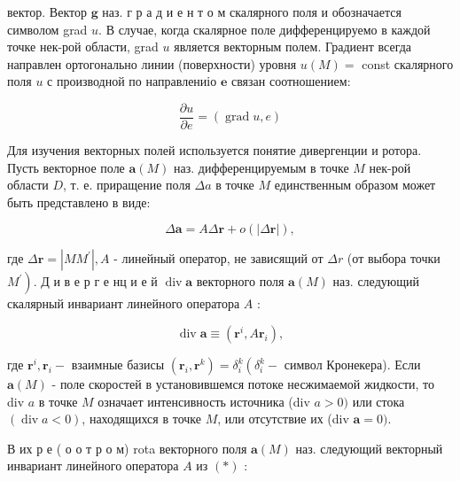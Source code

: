 \documentclass[10pt]{article}
\begin{document}
вектор. Вектор $\boldsymbol{g}$ наз. г р а д и е н т о м скалярного поля и обозначается символом grad $u$. В случае, когда скалярное поле дифференцируемо в каждой точке нек-рой области, grad $u$ является векторным полем. Градиент всегда направлен ортогонально линии (поверхности) уровня $u(M)=$ const скалярного поля $u$ с производной по направлениіо $\boldsymbol{e}$ связан соотношением:



\[

\frac{\partial u}{\partial e}=(\operatorname{grad} u, e)

\]



Для изучения векторных полей используется понятие дивергенции и ротора. Пусть векторное поле $\boldsymbol{a}(M)$ наз. дифференцируемым в точке $M$ нек-рой области $D$, т. е. приращение поля $\Delta a$ в точке $M$ единственным образом может быть представлено в виде:



\[

\Delta \boldsymbol{a}=A \Delta \boldsymbol{r}+o(|\Delta \boldsymbol{r}|),

\]



где $\Delta \boldsymbol{r}=\left|M M^{\prime}\right|, A$ - линейный оператор, не зависящий от $\Delta r$ (от выбора точки $\left.M^{\prime}\right)$. Д и в е р г е нц и е й $\operatorname{div} \boldsymbol{a}$ векторного поля $\boldsymbol{a}(M)$ наз. следующий скалярный инвариант линейного оператора $A$ :



\[

\operatorname{div} \boldsymbol{a} \equiv\left(\boldsymbol{r}^{i}, A \boldsymbol{r}_{i}\right),

\]



где $\boldsymbol{r}^{i}, \boldsymbol{r}_{i}-$ взаимные базисы $\left(\boldsymbol{r}_{i}, \boldsymbol{r}^{k}\right)=\delta_{i}^{k}\left(\delta_{i}^{k}-\right.$ символ Кронекера). Если $\boldsymbol{a}(M)$ - поле скоростей в установившемся потоке несжимаемой жидкости, то div $a$ в точке $M$ означает интенсивность источника (div $a>0)$ или стока $(\operatorname{div} a<0)$, находящихся в точке $M$, или отсутствие их (div $\boldsymbol{a}=0)$.



В их р е ( о о т р о м) rota векторного поля $\boldsymbol{a}(M)$ наз. следующий векторный инвариант линейного оператора $A$ из $(*)$ :
\end{document}
